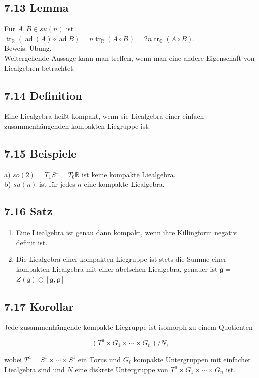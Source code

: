 \documentclass[10pt, letterpaper]{article}
\begin{document}
\subsection*{7.13 Lemma}
Für $A, B \in s u(n)$ ist $\operatorname{tr}_{\mathbb{R}}(\operatorname{ad}(A) \circ \operatorname{ad} B)=n \operatorname{tr}_{\mathbb{R}}(A \circ B)=2 n \operatorname{tr}_{\mathbb{C}}(A \circ B)$.\\
Beweis: Übung.\\
Weitergehende Aussage kann man treffen, wenn man eine andere Eigenschaft von Liealgebren betrachtet.

\subsection*{7.14 Definition}
Eine Liealgebra heißt kompakt, wenn sie Liealgebra einer einfach zusammenhängenden kompakten Liegruppe ist.

\subsection*{7.15 Beispiele}
a) $s o(2)=T_{1} S^{1}=T_{0} \mathbb{R}$ ist keine kompakte Liealgebra.\\
b) $s u(n)$ ist für jedes $n$ eine kompakte Liealgebra.

\subsection*{7.16 Satz}
\begin{enumerate}
  \item Eine Liealgebra ist genau dann kompakt, wenn ihre Killingform negativ definit ist.
  \item Die Liealgebra einer kompakten Liegruppe ist stets die Summe einer kompakten Liealgebra mit einer abelschen Liealgebra, genauer ist $\mathfrak{g}=$ $Z(\mathfrak{g}) \oplus[\mathfrak{g}, \mathfrak{g}]$
\end{enumerate}

\subsection*{7.17 Korollar}
Jede zusammenhängende kompakte Liegruppe ist isomorph zu einem Quotienten

$$
\left(T^{a} \times G_{1} \times \cdots \times G_{n}\right) / N,
$$

wobei $T^{a}=S^{1} \times \cdots \times S^{1}$ ein Torus und $G_{i}$ kompakte Untergruppen mit einfacher Liealgebra sind und $N$ eine diskrete Untergruppe von $T^{a} \times G_{1} \times \cdots \times G_{n}$ ist.
\end{document}
